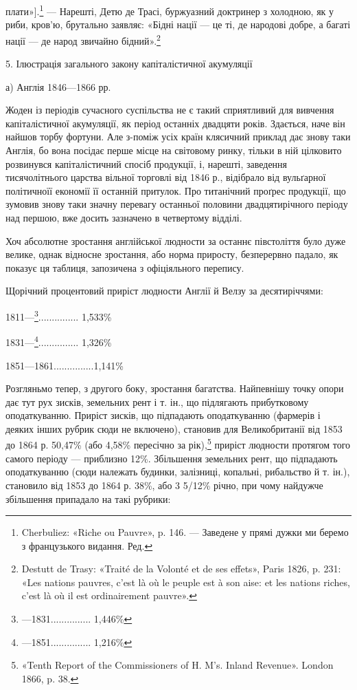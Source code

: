 плати»].\footnote*{
Cherbuliez: «Riche ou Pauvre», p. 146. — Заведене у прямі дужки
ми беремо з французького видання. Ред.
} — Нарешті, Детю де Трасі, буржуазний доктринер з
холодною, як у риби, кров’ю, брутально заявляє: «Бідні нації —
це ті, де народові добре, а багаті нації — де народ звичайно бідний».\footnote{
Destutt de Trasy: «Traité de la Volonté et de ses effets», Paris
1826, p. 231: «Les nations pauvres, c’est là où le peuple est à son aise: et
les nations riches, c’est là où il est ordinairement pauvre».
}

5. Ілюстрація загального закону капіталістичної акумуляції

а) Англія 1846—1866 рр.

Жоден із періодів сучасного суспільства не є такий сприятливий
для вивчення капіталістичної акумуляції, як період останніх
двадцяти років. Здається, наче він найшов торбу фортуни.
Але з-поміж усіх країн клясичний приклад дає знову таки
Англія, бо вона посідає перше місце на світовому ринку,
тільки в ній цілковито розвинувся капіталістичний спосіб продукції,
і, нарешті, заведення тисячолітнього царства вільної
торговлі від 1846 р., відібрало від вульґарної політичноїї економії
її останній притулок. Про титанічний проґрес продукції, що зумовив
знову таки значну перевагу останньої половини двадцятирічного
періоду над першою, вже досить зазначено в четвертому
відділі.

Хоч абсолютне зростання англійської людности за останнє півстоліття
було дуже велике, однак відносне зростання, або норма
приросту, безперервно падало, як показує ця таблиця, запозичена
з офіціяльного перепису.

Щорічний процентовий приріст людности Англії й Велзу
за десятиріччями:

1811—\footnote{
—1831............... 1,446\%
}............... 1,533\%

1831—\footnote{
—1851............... 1,216\%
}...............  1,326\%

1851—1861...............1,141\%

Розгляньмо тепер, з другого боку, зростання багатства. Найпевнішу
точку опори дає тут рух зисків, земельних рент і т. ін.,
що підлягають прибутковому оподаткуванню. Приріст зисків, що
підпадають оподаткуванню (фармерів і деяких інших рубрик сюди
не включено), становив для Великобританії від 1853 до 1864 р.
50,47\% (або 4,58\% пересічно за рік),\footnote{
«Tenth Report of the Commissioners of H. M’s. Inland Revenue».
London 1866, p. 38.
} приріст людности протягом
того самого періоду — приблизно 12\%. Збільшення земельних
рент, що підпадають оподаткуванню (сюди належать
будинки, залізниці, копальні, рибальство й т. ін.), становило
від 1853 до 1864 р. 38\%, або 3 5/12\% річно, при чому найдужче
збільшення припадало на такі рубрики: